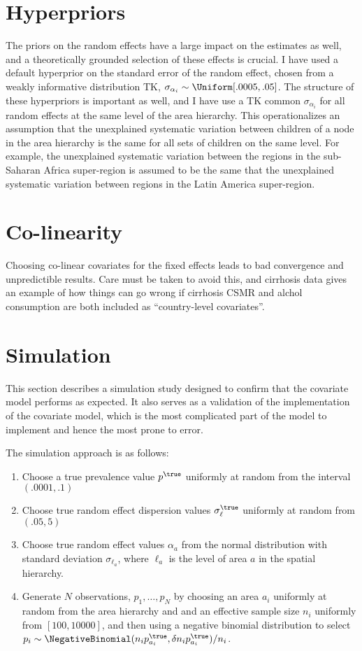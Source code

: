 \section{Hyperpriors}
The priors on the random effects have a large impact on the estimates
as well, and a theoretically grounded selection of these effects is
crucial.  I have used a default hyperprior on the standard error of the random
effect, chosen from a weakly informative distribution TK, $\sigma_{\alpha_i}
\sim \Uniform[.0005, .05]$.  The structure of these hyperpriors is
important as well, and I have use a TK common $\sigma_{\alpha_i}$ for all
random effects at the same level of the area hierarchy.  This
operationalizes an assumption that the unexplained systematic variation between
children of a node in the area hierarchy is the same for all sets of
children on the same level.  For example, the unexplained systematic
variation between the regions in the sub-Saharan Africa super-region
is assumed to be the same that the unexplained systematic variation
between regions in the Latin America super-region.

\section{Co-linearity}
Choosing co-linear covariates for the fixed effects leads to bad
convergence and unpredictible results.  Care must be taken to avoid
this, and cirrhosis data gives an example of how things can go wrong
if cirrhosis CSMR and alchol consumption are both included as
``country-level covariates''.

\section{Simulation}
This section describes a simulation study designed to confirm that the
covariate model performs as expected.  It also serves as a validation
of the implementation of the covariate model, which is the most
complicated part of the model to implement and hence the most prone to
error.

The simulation approach is as follows:
\begin{enumerate}
\item Choose a true prevalence value $p^\true$ uniformly at random
  from the interval $(.0001, .1)$
\item Choose true random effect dispersion values $\sigma_\ell^\true$
  uniformly at random from $(.05, 5)$
\item Choose true random effect values $\alpha_a$ from the normal
  distribution with standard deviation $\sigma_{\ell_a}$, where
  $\ell_a$ is the level of area $a$ in the spatial hierarchy.
\item Generate $N$ observations, $p_1,\ldots,p_N$ by choosing an area
  $a_i$ uniformly at random from the area hierarchy and and an
  effective sample size $n_i$ uniformly from $[100,10000]$, and then
  using a negative binomial distribution to select $p_i \sim
  \NegativeBinomial(n_i p^\true_{a_i}, \delta n_i p^\true_{a_i})/n_i$.
\end{enumerate}

